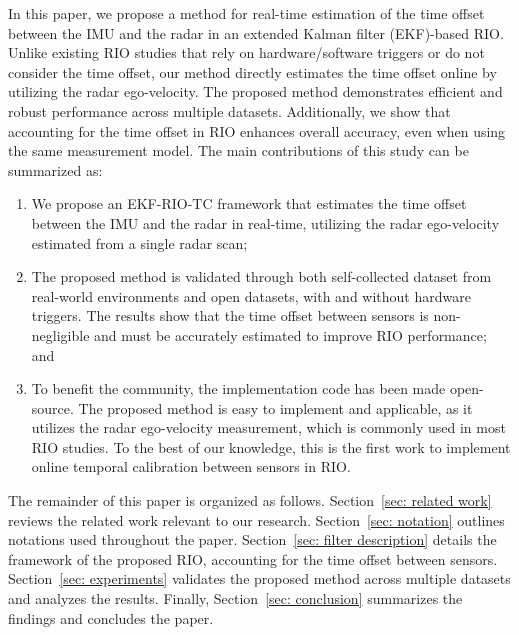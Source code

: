 In this paper, we propose a method for real-time estimation of the time offset between the IMU and the radar in an extended Kalman filter (EKF)-based RIO. Unlike existing RIO studies that rely on hardware/software triggers or do not consider the time offset, our method directly estimates the time offset online by utilizing the radar ego-velocity. The proposed method demonstrates efficient and robust performance across multiple datasets. Additionally, we show that accounting for the time offset in RIO enhances overall accuracy, even when using the same measurement model. The main contributions of this study can be summarized as: 
\begin{enumerate}
    \item We propose an EKF-RIO-TC framework that estimates the time offset between the IMU and the radar in real-time, utilizing the radar ego-velocity estimated from a single radar scan;
    \item The proposed method is validated through both self-collected dataset from real-world environments and open datasets, with and without hardware triggers. The results show that the time offset between sensors is non-negligible and must be accurately estimated to improve RIO performance; and
    \item To benefit the community, the implementation code has been made open-source. The proposed method is easy to implement and applicable, as it utilizes the radar ego-velocity measurement, which is commonly used in most RIO studies. To the best of our knowledge, this is the first work to implement online temporal calibration between sensors in RIO.
\end{enumerate}

The remainder of this paper is organized as follows. Section~\ref{sec: related work} reviews the related work relevant to our research. Section~\ref{sec: notation} outlines notations used throughout the paper. Section~\ref{sec: filter description} details the framework of the proposed RIO, accounting for the time offset between sensors. Section~\ref{sec: experiments} validates the proposed method across multiple datasets and analyzes the results. Finally, Section~\ref{sec: conclusion} summarizes the findings and concludes the paper.